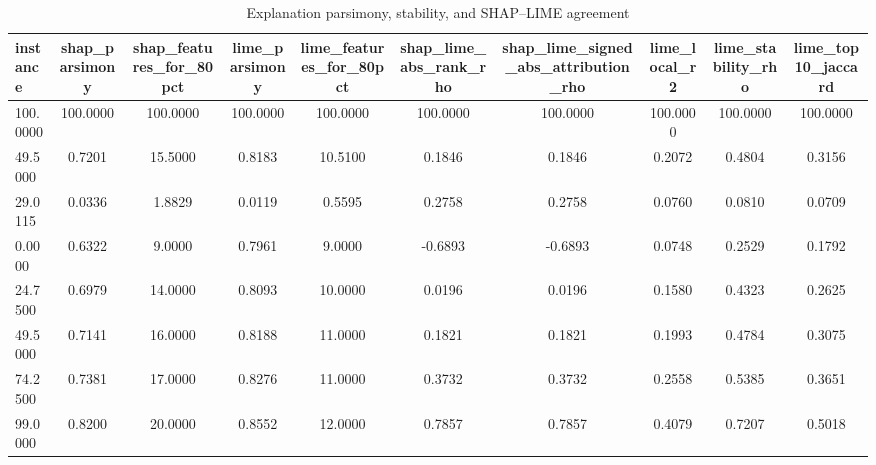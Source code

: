 \begin{table}
\centering
\caption{Explanation parsimony, stability, and SHAP--LIME agreement}
\label{tab:explanation_quality}
\begin{tabular}{lccccccccc}
\toprule
instance & shap_parsimony & shap_features_for_80pct & lime_parsimony & lime_features_for_80pct & shap_lime_abs_rank_rho & shap_lime_signed_abs_attribution_rho & lime_local_r2 & lime_stability_rho & lime_top10_jaccard \\
\midrule
100.0000 & 100.0000 & 100.0000 & 100.0000 & 100.0000 & 100.0000 & 100.0000 & 100.0000 & 100.0000 & 100.0000 \\
49.5000 & 0.7201 & 15.5000 & 0.8183 & 10.5100 & 0.1846 & 0.1846 & 0.2072 & 0.4804 & 0.3156 \\
29.0115 & 0.0336 & 1.8829 & 0.0119 & 0.5595 & 0.2758 & 0.2758 & 0.0760 & 0.0810 & 0.0709 \\
0.0000 & 0.6322 & 9.0000 & 0.7961 & 9.0000 & -0.6893 & -0.6893 & 0.0748 & 0.2529 & 0.1792 \\
24.7500 & 0.6979 & 14.0000 & 0.8093 & 10.0000 & 0.0196 & 0.0196 & 0.1580 & 0.4323 & 0.2625 \\
49.5000 & 0.7141 & 16.0000 & 0.8188 & 11.0000 & 0.1821 & 0.1821 & 0.1993 & 0.4784 & 0.3075 \\
74.2500 & 0.7381 & 17.0000 & 0.8276 & 11.0000 & 0.3732 & 0.3732 & 0.2558 & 0.5385 & 0.3651 \\
99.0000 & 0.8200 & 20.0000 & 0.8552 & 12.0000 & 0.7857 & 0.7857 & 0.4079 & 0.7207 & 0.5018 \\
\bottomrule
\end{tabular}
\end{table}
